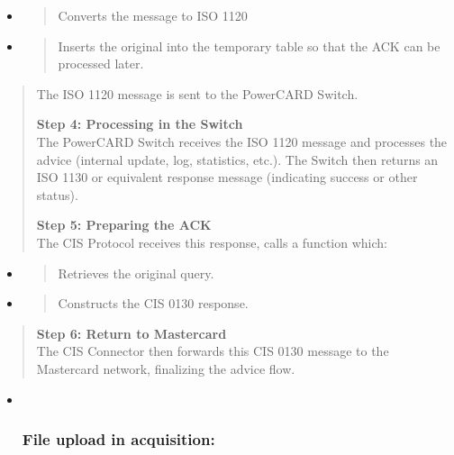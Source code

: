 \documentclass[12pt,a4paper]{report}
\begin{document}
\begin{itemize}
\item
  \begin{quote}
  Converts the message to ISO 1120
  \end{quote}
\item
  \begin{quote}
  Inserts the original into the temporary table so that the ACK can be
  processed later.
  \end{quote}
\end{itemize}

\begin{quote}
The ISO 1120 message is sent to the PowerCARD Switch.

\textbf{Step 4: Processing in the Switch}\\
The PowerCARD Switch receives the ISO 1120 message and processes the
advice (internal update, log, statistics, etc.). The Switch then returns
an ISO 1130 or equivalent response message (indicating success or other
status).

\textbf{Step 5: Preparing the ACK}\\
The CIS Protocol receives this response, calls a function which:
\end{quote}

\begin{itemize}
\item
  \begin{quote}
  Retrieves the original query.
  \end{quote}
\item
  \begin{quote}
  Constructs the CIS 0130 response.
  \end{quote}
\end{itemize}

\begin{quote}
\textbf{Step 6: Return to Mastercard}\\
The CIS Connector then forwards this CIS 0130 message to the Mastercard
network, finalizing the advice flow.
\end{quote}

\begin{itemize}
\item ~
  \hypertarget{file-upload-in-acquisition}{%
  \subsubsection{\texorpdfstring{\textbf{File upload in
  acquisition:}}{File upload in acquisition:}}\label{file-upload-in-acquisition}}
\end{itemize}
\end{document}
